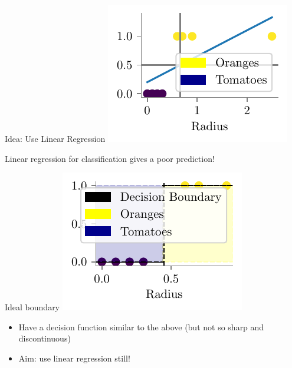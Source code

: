 \documentclass{beamer}
\begin{document}
\begin{frame}{Idea: Use Linear Regression}
\includegraphics{../figures/logistic-regression/linear-orange-tomatoes-decision-modified.pdf}


Linear regression for classification gives a poor prediction!
\end{frame}

\begin{frame}{Ideal boundary}
\includegraphics{../figures/logistic-regression/linear-orange-tomatoes-decision-ideal.pdf}

\begin{itemize}[<+->]
	\item Have a decision function similar to the above (but not so sharp and discontinuous)
	\item Aim: use linear regression still!
\end{itemize}
\end{frame}
\end{document}
